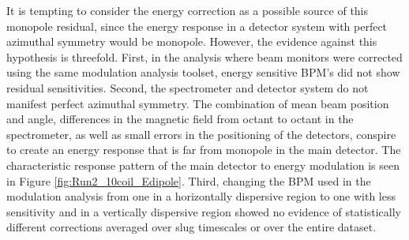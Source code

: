 It is tempting to consider the energy correction as a possible source of this monopole residual, since the energy response in a detector system with perfect azimuthal symmetry would be monopole. However, the evidence against this hypothesis is threefold. First, in the analysis where beam monitors were corrected using the same modulation analysis toolset, energy sensitive BPM's did not show residual sensitivities. Second, the \qtor spectrometer and detector system do not manifest perfect azimuthal symmetry. The combination of mean beam position and angle, differences in the magnetic field from octant to octant in the spectrometer, as well as small errors in the positioning of the detectors, conspire to create an energy response that is far from monopole in the main detector. The characteristic response pattern of the main detector to energy modulation is seen in Figure \ref{fig:Run2_10coil_Edipole}. Third, changing the BPM used in the modulation analysis from one in a horizontally dispersive region to one with less sensitivity and in a vertically dispersive region showed no evidence of statistically different corrections averaged over slug timescales or over the entire dataset.

